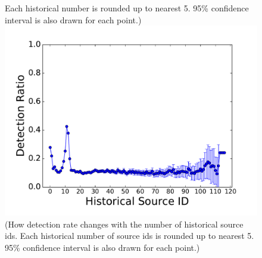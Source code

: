\begin{figure}[!htb]
{{Each historical number is rounded up to nearest 5.
95\% confidence interval is also drawn for each point.)}}
\endminipage\hfill
{}%
  \includegraphics[width=\linewidth]{figure/SubID}
{\footnotesize{(How detection rate changes with the number of historical source ids. 
Each historical number of source ids is rounded up to nearest 5.
95\% confidence interval is also drawn for each point.)}}
\endminipage\hfill

\end{figure}

